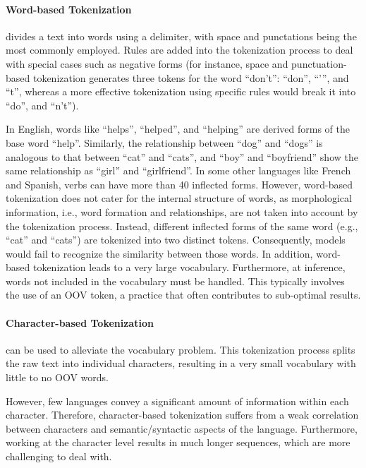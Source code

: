 \paragraph{Word-based Tokenization} divides a text into words using a delimiter, with space and punctations being the most commonly employed. Rules are added into the tokenization process to deal with special cases such as negative forms (for instance, space and punctuation-based tokenization generates three tokens for the word “don't”:  “don”, “'”, and “t”, whereas a more effective tokenization using specific rules would  break it into “do”, and “n't”).

In English, words like “helps”, “helped”, and “helping” are derived forms of the base word “help”. Similarly, the relationship between “dog” and “dogs” is analogous to that between “cat” and “cats”, and “boy” and “boyfriend” show the same relationship as “girl” and “girlfriend”. In some other languages like French and Spanish, verbs can have more than 40 inflected forms. However, word-based tokenization does not cater for the internal structure of words, as morphological information, i.e., word formation and relationships, are not taken into account by the tokenization process. Instead, different inflected forms of the same word (e.g., “cat” and “cats”) are tokenized into two distinct tokens. Consequently, models would fail to recognize the similarity between those words. In addition, word-based tokenization leads to a very large vocabulary. Furthermore, at inference, words not included in the vocabulary must be handled. This typically involves the use of an \ac{OOV} token, a practice that often contributes to sub-optimal results.

\paragraph{Character-based Tokenization} \citep{wehrmann2017character} can be used to alleviate the vocabulary problem. This tokenization process splits the raw text into individual characters, resulting in a very small vocabulary with little to no \ac{OOV} words. 

However, few languages convey a significant amount of information within each character. Therefore, character-based tokenization suffers from a weak correlation between characters and semantic/syntactic aspects of the language. Furthermore, working at the character level results in much longer sequences, which are more challenging to deal with.

